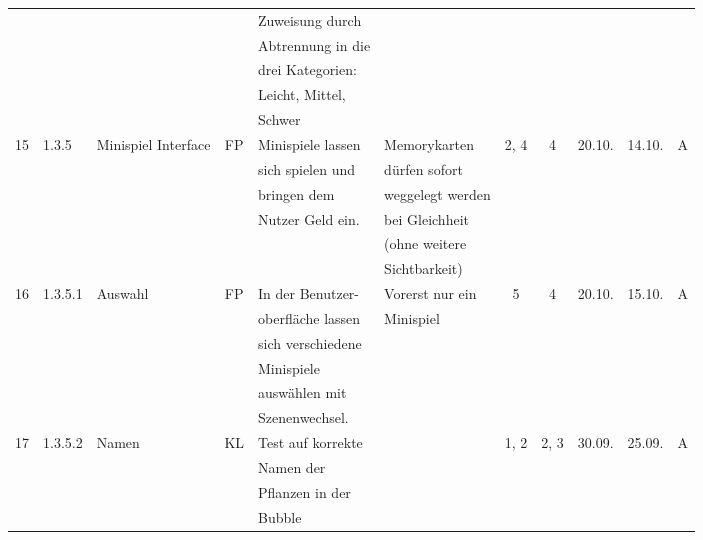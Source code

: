 \begin{longtable}{|c|l|l|c|l|l|c|c|l|l|l|}
            &       &            &    & Zuweisung durch &   &   & & & &\\
            &       &            &    & Abtrennung in die &   &   & & & &\\
            &       &            &    & drei Kategorien: &   &   & & & &\\
            &       &            &    & Leicht, Mittel, &   &   & & & &\\
            &       &            &    & Schwer &   &   & & & &\\
            \hline
            15 & 1.3.5 & Minispiel Interface & FP & Minispiele lassen & Memorykarten & 2, 4 & 4 & 20.10. & 14.10. & A \\
            &       &            &    & sich spielen und & dürfen sofort  &   & & & &\\
            &       &            &    & bringen dem & weggelegt werden  &   & & & &\\
            &       &            &    & Nutzer Geld ein. & bei Gleichheit  &   & & & &\\
            &       &            &    &  &  (ohne weitere &   & & & &\\
            &       &            &    &  & Sichtbarkeit)  &   & & & &\\
            \hline
            16 & 1.3.5.1 & Auswahl & FP & In der Benutzer- & Vorerst nur ein & 5 & 4 & 20.10. & 15.10. & A \\
            &       &            &    & oberfläche lassen &  Minispiel &   & & & &\\
            &       &            &    & sich verschiedene &   &   & & & &\\
            &       &            &    & Minispiele &   &   & & & &\\
            &       &            &    & auswählen mit &   &   & & & &\\
            &       &            &    & Szenenwechsel. &   &   & & & &\\
            \hline
            17 & 1.3.5.2 & Namen & KL & Test auf korrekte &  & 1, 2 & 2, 3 & 30.09. & 25.09. & A \\
            &       &            &    & Namen der &   &   & & & &\\
            &       &            &    & Pflanzen in der &   &   & & & &\\
            &       &            &    & Bubble &   &   & & & &\\
            \hline

\end{longtable}
